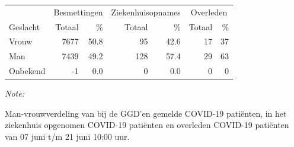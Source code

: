 \documentclass[
  english,
  man,floatsintext]{apa6}
\begin{document}
\begin{table}
\centering\begingroup\fontsize{11}{13}\selectfont

\begin{threeparttable}
\begin{tabular}{lrrrrrr}
\toprule
\multicolumn{1}{c}{ } & \multicolumn{2}{c}{Besmettingen} & \multicolumn{2}{c}{Ziekenhuisopnames} & \multicolumn{2}{c}{Overleden} \\
\cmidrule(l{3pt}r{3pt}){2-3} \cmidrule(l{3pt}r{3pt}){4-5} \cmidrule(l{3pt}r{3pt}){6-7}
Geslacht & Totaal & \% & Totaal & \% & Totaal & \%\\
\midrule
Vrouw & 7677 & 50.8 & 95 & 42.6 & 17 & 37\\
Man & 7439 & 49.2 & 128 & 57.4 & 29 & 63\\
Onbekend & -1 & 0.0 & 0 & 0.0 & 0 & 0\\
\bottomrule
\end{tabular}
\begin{tablenotes}
\item \textit{Note: } 
\item Man-vrouwverdeling van bij de GGD’en gemelde COVID-19 patiënten, in het ziekenhuis opgenomen COVID-19 patiënten en overleden COVID-19 patiënten van 07 juni t/m 21 juni 10:00 uur.
\end{tablenotes}
\end{threeparttable}
\endgroup{}
\end{table}
\newpage
\end{document}
